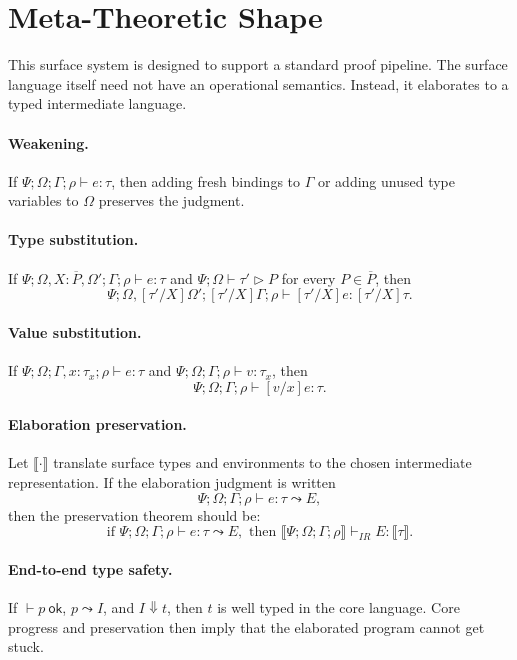 \documentclass[manuscript]{acmart}
\newcommand{\kw}[1]{\ensuremath{\mathsf{#1}}}
\newcommand{\ok}{\ \kw{ok}}
\newcommand{\subst}[3]{[#1/#2]#3}
\newcommand{\has}{\vdash}
\newcommand{\modelsP}{\mathrel{\triangleright}}
\begin{document}
\section{Meta-Theoretic Shape}

This surface system is designed to support a standard proof pipeline.
The surface language itself need not have an operational semantics.
Instead, it elaborates to a typed intermediate language.

\paragraph{Weakening.}
If $\Psi;\Omega;\Gamma;\rho \has e:\tau$, then adding fresh bindings to $\Gamma$ or adding unused type variables to $\Omega$ preserves the judgment.

\paragraph{Type substitution.}
If $\Psi;\Omega,X:\overline{P},\Omega';\Gamma;\rho \has e:\tau$ and $\Psi;\Omega \has \tau' \modelsP P$ for every $P \in \overline{P}$, then
\[
  \Psi;\Omega,\subst{\tau'}{X}\Omega';
    \subst{\tau'}{X}\Gamma;\rho
  \has
  \subst{\tau'}{X}e :
  \subst{\tau'}{X}\tau.
\]

\paragraph{Value substitution.}
If $\Psi;\Omega;\Gamma,x:\tau_x;\rho \has e:\tau$ and
$\Psi;\Omega;\Gamma;\rho \has v:\tau_x$, then
\[
  \Psi;\Omega;\Gamma;\rho \has \subst{v}{x}e:\tau.
\]

\paragraph{Elaboration preservation.}
Let $\llbracket \cdot \rrbracket$ translate surface types and environments to the chosen intermediate representation.
If the elaboration judgment is written
\[
  \Psi;\Omega;\Gamma;\rho \has e:\tau \leadsto E,
\]
then the preservation theorem should be:
\[
  \text{if } \Psi;\Omega;\Gamma;\rho \has e:\tau \leadsto E,
  \text{ then }
  \llbracket\Psi;\Omega;\Gamma;\rho\rrbracket
  \has_{\mathit{IR}}
  E : \llbracket\tau\rrbracket.
\]

\paragraph{End-to-end type safety.}
If $\has p \ok$, $p \leadsto I$, and $I \Downarrow t$, then $t$ is well typed in the core language.
Core progress and preservation then imply that the elaborated program cannot get stuck.
\end{document}
